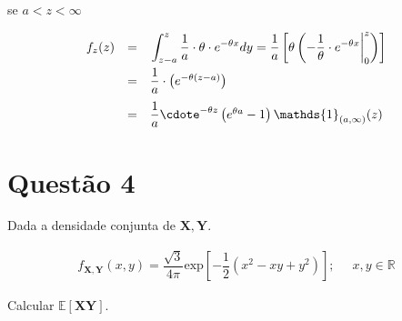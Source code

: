 \documentclass[a4paper, 11pt]{article}
\begin{document}
\hspace{1cm} se $a<z<\infty$

\begin{equation*}
\begin{array}{lclll}
f_{z}(z) & = & \left.\displaystyle\int_{z-a}^{z} \dfrac{1}{a} \cdot \theta \cdot e^{-\theta x} dy = \dfrac{1}{a}\left[ \theta \left( -\dfrac{1}{\theta} \cdot e^{-\theta x} \right\vert_{0}^{z}\right) \right] \\[10pt]
& = & \dfrac{1}{a}\cdot\left( e^{-\theta (z-a)} \right) \\[10pt]
& = & \dfrac{1}{a}\cdote^{-\theta z}\left( e^{\theta a} - 1\right) \mathds{1}_{(a,\infty)}(z) \\
\end{array}
\end{equation*}

\section*{Questão 4}

Dada a densidade conjunta de $\mathbf{X},\mathbf{Y}$. 

\begin{equation*}
\begin{array}{lclll}
f_{\mathbf{X},\mathbf{Y}}(x,y) = \dfrac{\sqrt{3}}{4\pi}\mbox{exp}\left[ -\dfrac{1}{2} (x^{2} - xy + y^{2}) \right]; \; & \; x,y \in \mathds{R}
\end{array}
\end{equation*}

Calcular $\mathds{E}[\mathbf{X}\mathbf{Y}]$.
\end{document}
